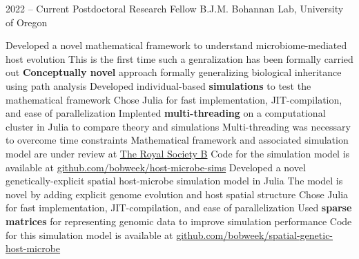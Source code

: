 \documentclass[9pt]{developercv} %
\begin{document}
\vspace{-5 pt}
\begin{entrylist}
	\entry
        {2022 -- Current}
		{Postdoctoral Research Fellow}
		{B.J.M. Bohannan Lab, University of Oregon}
            {\vspace{-10 pt}\begin{outline}[itemize]
                    \1 Developed a novel mathematical framework to understand microbiome-mediated host evolution
                        \vspace{-6 pt} \2[$\cdot$] This is the first time such a genralization has been formally carried out
                        \vspace{-3 pt} \2[$\cdot$] \textbf{Conceptually novel} approach formally generalizing biological inheritance using path analysis
                    \vspace{-6 pt}\1 Developed individual-based \textbf{simulations} to test the mathematical framework
                        \vspace{-6 pt} \2[$\cdot$] Chose Julia for fast implementation, JIT-compilation, and ease of parallelization
                    \vspace{-6 pt}\1 Implented \textbf{multi-threading} on a computational cluster in Julia to compare theory and simulations
                        \vspace{-6 pt} \2[$\cdot$] Multi-threading was necessary to overcome time constraints
                    \vspace{-6 pt}\1 Mathematical framework and associated simulation model are under review at \href{https://royalsocietypublishing.org/journal/rspb}{\footnotesize{The Royal Society B}}
                        \vspace{-6 pt} \2[$\cdot$] Code for the simulation model is available at \href{https://github.com/bobweek/host-microbe-sims}{\footnotesize{github.com/bobweek/host-microbe-sims}}
                    \vspace{-6 pt}\1 Developed a novel genetically-explicit spatial host-microbe simulation model in Julia
                        \vspace{-6 pt} \2[$\cdot$] The model is novel by adding explicit genome evolution and host spatial structure
                        \vspace{-3 pt} \2[$\cdot$] Chose Julia for fast implementation, JIT-compilation, and ease of parallelization
                        \vspace{-3 pt} \2[$\cdot$] Used \textbf{sparse matrices} for representing genomic data to improve simulation performance
                        \vspace{-3 pt} \2[$\cdot$] Code for this simulation model is available at \href{https://github.com/bobweek/spatial-genetic-host-microbe}{\footnotesize{github.com/bobweek/spatial-genetic-host-microbe}}
                    

\end{outline}}
\end{entrylist}
\end{document}
